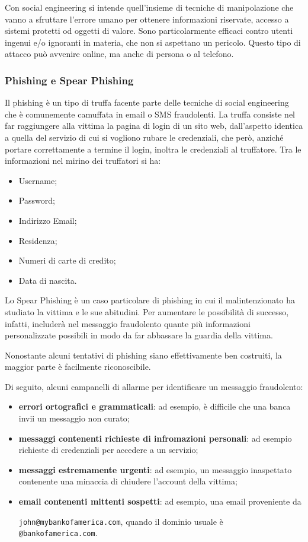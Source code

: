 Con social engineering si intende quell'insieme di tecniche di manipolazione che vanno a sfruttare l'errore umano per ottenere informazioni riservate, accesso a sistemi protetti od oggetti di valore. Sono particolarmente efficaci contro utenti ingenui e/o ignoranti in materia, che non si aspettano un pericolo. Questo tipo di attacco può avvenire online, ma anche di persona o al telefono.

\subsubsection{Phishing e Spear Phishing}

Il phishing è un tipo di truffa facente parte delle tecniche di social engineering che è comunemente camuffata in email o SMS fraudolenti. La truffa consiste nel far raggiungere alla vittima la pagina di login di un sito web, dall'aspetto identica a quella del servizio di cui si vogliono rubare le credenziali, che però, anziché portare correttamente a termine il login, inoltra le credenziali al truffatore.
Tra le informazioni nel mirino dei truffatori si ha:
\begin{itemize}
    \item Username;
    \item Password;
    \item Indirizzo Email;
    \item Residenza;
    \item Numeri di carte di credito;
    \item Data di nascita.
\end{itemize}

Lo Spear Phishing è un caso particolare di phishing in cui il malintenzionato ha studiato la vittima e le sue abitudini. Per aumentare le possibilità di successo, infatti, includerà nel messaggio fraudolento quante più informazioni personalizzate possibili in modo da far abbassare la guardia della vittima.

Nonostante alcuni tentativi di phishing siano effettivamente ben costruiti, la maggior parte è facilmente riconoscibile.

Di seguito, alcuni campanelli di allarme per identificare un messaggio fraudolento:

\begin{itemize}
    \item \textbf{errori ortografici e grammaticali}: ad esempio, è difficile che una banca invii un messaggio non curato;
    \item \textbf{messaggi contenenti richieste di infromazioni personali}: ad esempio richieste di credenziali per accedere a un servizio;
    \item \textbf{messaggi estremamente urgenti}: ad esempio, un messaggio inaspettato contenente una minaccia di chiudere l'account della vittima;
    \item \textbf{email contenenti mittenti sospetti}: ad esempio, una email proveniente da

          \texttt{john@mybankofamerica.com}, quando il dominio usuale è \texttt{@bankofamerica.com}.
\end{itemize}

